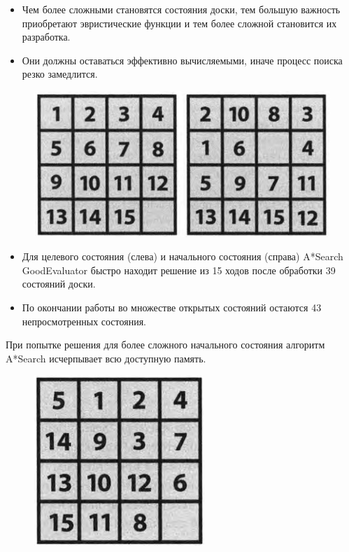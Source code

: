 \documentclass{beamer}
\begin{document}
\begin{frame}
\begin{itemize}
\item Чем более сложными становятся состояния доски, тем большую важность приобретают эвристические функции и тем более сложной становится их разработка. 
\item Они должны оставаться эффективно вычисляемыми, иначе процесс поиска резко замедлится.
\end{itemize}
\begin{figure}[h]
\centering
\includegraphics[scale=0.4]{images/lec06-pic15.png}
\end{figure}
\begin{itemize}
\item Для целевого состояния (слева) и начального состояния (справа) A*Search GoodEvaluator быстро находит решение из 15 ходов после обработки 39 состояний доски. 
\item По окончании работы во множестве открытых состояний остаются 43 непросмотренных состояния.
\end{itemize}
\end{frame}

\begin{frame}
При попытке решения для более сложного начального состояния алгоритм A*Search исчерпывает всю доступную память.
\begin{figure}[h]
\centering
\includegraphics[scale=0.4]{images/lec06-pic16.png}
\end{figure}
\end{frame}
\end{document}
